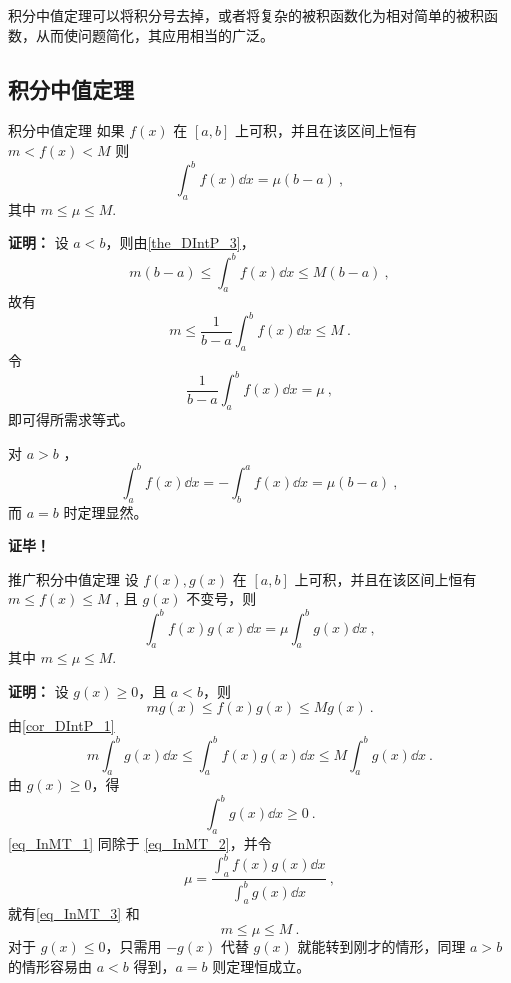 
积分中值定理可以将积分号去掉，或者将复杂的被积函数化为相对简单的被积函数，从而使问题简化，其应用相当的广泛。

\subsection{积分中值定理}
\begin{theorem}{积分中值定理}
如果 $f(x)$ 在 $[a,b]$ 上可积，并且在该区间上恒有$m<f(x)<M$
则
\begin{equation}
\int_a^b f(x)\dd x=\mu(b-a)~,
\end{equation}
其中 $m\leq\mu\leq M.$
\end{theorem}

\textbf{证明：}
设 $a<b$，则由\autoref{the_DIntP_3}，
\begin{equation}
m(b-a)\leq\int_a^b f(x)\dd x\leq M(b-a)~,
\end{equation}
故有
\begin{equation}
m\leq\frac{1}{b-a}\int_a^b f(x)\dd x\leq M~.
\end{equation}
令
\begin{equation}
\frac{1}{b-a}\int_a^b f(x)\dd x=\mu~,
\end{equation}
即可得所需求等式。

对 $a>b$ ，
\begin{equation}
\int_a^b f(x)\dd x=-\int_b^a f(x)\dd x=\mu(b-a)~,
\end{equation}
而 $a=b$ 时定理显然。 

\textbf{证毕！}

\begin{theorem}{推广积分中值定理}\label{the_InMT_1}
设 $f(x),g(x)$ 在 $[a,b]$ 上可积，并且在该区间上恒有$m\leq f(x)\leq M$
, 且 $g(x)$ 不变号，则
\begin{equation}\label{eq_InMT_3}
\int_a^b f(x)g(x)\dd x=\mu\int_a^b g(x)\dd x~,
\end{equation}
其中 $m\leq\mu\leq M.$
\end{theorem}
\textbf{证明：}
设 $g(x)\geq 0$，且 $a<b$，则
\begin{equation}
mg(x)\leq f(x)g(x)\leq Mg(x)~.
\end{equation}
由\autoref{cor_DIntP_1} 
\begin{equation}\label{eq_InMT_1}
m\int_a^b g(x)\dd x\leq\int_a^b f(x)g(x)\dd x\leq M\int_a^b g(x)\dd x~.
\end{equation}
由 $g(x)\geq0$，得
\begin{equation}\label{eq_InMT_2}
\int_a^b g(x)\dd x\geq0~.
\end{equation}
\autoref{eq_InMT_1} 同除于 \autoref{eq_InMT_2}，并令
\begin{equation}
\mu=\frac{\int_a^b f(x)g(x)\dd x}{\int_a^b g(x)\dd x}~,
\end{equation}
就有\autoref{eq_InMT_3} 和
\begin{equation}
m\leq\mu\leq M~.
\end{equation}
对于 $g(x)\leq0$，只需用 $-g(x)$ 代替 $g(x)$ 就能转到刚才的情形，同理 $a>b$ 的情形容易由 $a<b$ 得到，$a=b$ 则定理恒成立。

